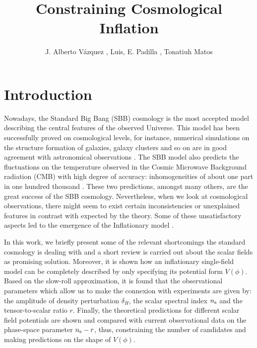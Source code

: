 \documentclass{rmaa}
\title{Constraining Cosmological Inflation}
\author{
J. Alberto V\'azquez \altaffilmark{1}, Luis, E. Padilla \altaffilmark{2,3}, Tonatiuh Matos \altaffilmark{2,3}}
\begin{document}

  \maketitle

\section{Introduction}

Nowadays, the Standard Big Bang (SBB) cosmology is the most accepted model describing 
the central features of the observed Universe. This model has been successfully proved on 
cosmological levels, for instance, numerical simulations on the structure formation of galaxies,
galaxy clusters and so on are in good agreement with astronomical observations \citep{Teg, Sping}. 
The SBB model also predicts the fluctuations on the temperature observed in the Cosmic 
Microwave Background radiation (CMB) with high degree of accuracy: 
inhomogeneities of about one part in one hundred thousand \citep{Komat}.
 These two predictions, amongst many others, are the great success of 
the SBB cosmology. Nevertheless, %
when we look at cosmological observations, there might seem to exist certain 
inconsistencies or unexplained features in contrast   with expected by 
the theory. Some of these unsatisfactory aspects led to the 
emergence of the Inflationary model \citep{Guth, Linde, Linde2, Steinhardt}.

In this work, we briefly present some of the relevant shortcomings the standard 
cosmology is dealing with and a short review is carried out about the scalar fields as  
promising solution. Moreover, it is shown how an inflationary single-field model can be completely described 
by only specifying its potential form $V(\phi)$. 
Based on the slow-roll approximation, it is found that the observational parameters 
which allow us to make the connexion with experiments are given by: 
the amplitude of density perturbation $\delta_H$, the scalar spectral index $n_{\rm s}$
and the tensor-to-scalar ratio $r$.
Finally, the theoretical predictions for different scalar field potentials are shown and 
compared with current observational data on the phase-space parameter $n_{\rm s}-r$, 
thus, constraining the number of candidates and making predictions on the shape of $V(\phi)$. 
\end{document}
